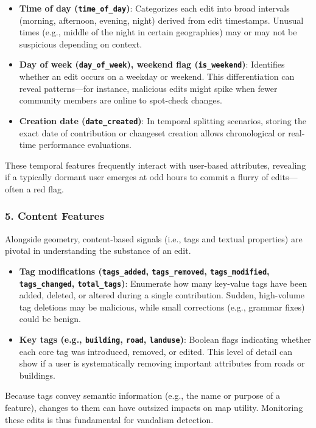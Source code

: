 \documentclass[
    13pt, %
    a4paper, %
    twoside, 
    DIV14, %
    listof=totoc, %
    bibliography=totoc, %
    index=totoc, %
    headsepline
]{scrreprt}
\begin{document}
\begin{itemize}
  \item \textbf{Time of day (\texttt{time\_of\_day})}: Categorizes each edit into broad intervals (morning, afternoon, evening, night) derived from edit timestamps. Unusual times (e.g., middle of the night in certain geographies) may or may not be suspicious depending on context.
  \item \textbf{Day of week (\texttt{day\_of\_week}), weekend flag (\texttt{is\_weekend})}: Identifies whether an edit occurs on a weekday or weekend. This differentiation can reveal patterns—for instance, malicious edits might spike when fewer community members are online to spot-check changes.
  \item \textbf{Creation date (\texttt{date\_created})}: In temporal splitting scenarios, storing the exact date of contribution or changeset creation allows chronological or real-time performance evaluations.
\end{itemize}

These temporal features frequently interact with user-based attributes, revealing if a typically dormant user emerges at odd hours to commit a flurry of edits—often a red flag.

\subsubsection*{5. Content Features}
Alongside geometry, content-based signals (i.e., tags and textual properties) are pivotal in understanding the substance of an edit.

\begin{itemize}
  \item \textbf{Tag modifications (\texttt{tags\_added}, \texttt{tags\_removed}, \texttt{tags\_modified}, \texttt{tags\_changed}, \texttt{total\_tags})}: Enumerate how many key-value tags have been added, deleted, or altered during a single contribution. Sudden, high-volume tag deletions may be malicious, while small corrections (e.g., grammar fixes) could be benign.
  \item \textbf{Key tags (e.g., \texttt{building}, \texttt{road}, \texttt{landuse})}: Boolean flags indicating whether each core tag was introduced, removed, or edited. This level of detail can show if a user is systematically removing important attributes from roads or buildings.
\end{itemize}

Because tags convey semantic information (e.g., the name or purpose of a feature), changes to them can have outsized impacts on map utility. Monitoring these edits is thus fundamental for vandalism detection.
\end{document}
